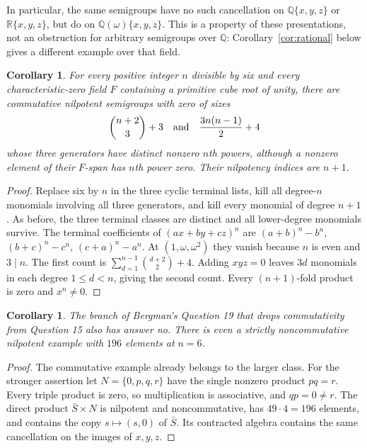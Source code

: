 \documentclass[11pt]{article}
\newtheorem{corollary}[theorem]{Corollary}
\begin{document}
In particular, the same semigroups have no such cancellation on
$\mathbb Q\{x,y,z\}$ or $\mathbb R\{x,y,z\}$, but do on
$\mathbb Q(\omega)\{x,y,z\}$. This is a property of these presentations,
not an obstruction for arbitrary semigroups over $\mathbb Q$:
Corollary~\ref{cor:rational} below gives a different example over that field.

\begin{corollary}\label{cor:multiples}
For every positive integer $n$ divisible by six and every characteristic-zero
field $F$ containing a primitive cube root of unity, there are commutative
nilpotent semigroups with zero of sizes
\[
\binom{n+2}{3}+3\quad\hbox{and}\quad \frac{3n(n-1)}2+4
\]
whose three generators have distinct nonzero $n$th powers, although a
nonzero element of their $F$-span has $n$th power zero.
Their nilpotency indices are $n+1$.
\end{corollary}
\begin{proof}
Replace six by $n$ in the three cyclic terminal lists, kill all degree-$n$
monomials involving all three generators, and kill every monomial of
degree $n+1$. As before, the three terminal classes are distinct and
all lower-degree monomials survive. The terminal coefficients of
$(ax+by+cz)^n$ are $(a+b)^n-b^n$, $(b+c)^n-c^n$, $(c+a)^n-a^n$.
At $(1,\omega,\omega^2)$ they vanish because $n$ is even and $3\mid n$.
The first count is $\sum_{d=1}^{n-1}\binom{d+2}{2}+4$.
Adding $xyz=0$ leaves $3d$ monomials in each degree $1\le d<n$, giving
the second count. Every $(n+1)$-fold product is zero and $x^n\ne0$.
\end{proof}

\begin{corollary}\label{cor:19}
The branch of Bergman's Question 19 that drops commutativity from
Question 15 also has answer no. There is even a strictly noncommutative
nilpotent example with $196$ elements at $n=6$.
\end{corollary}
\begin{proof}
The commutative example already belongs to the larger class. For the
stronger assertion let $N=\{0,p,q,r\}$ have the single nonzero product
$pq=r$. Every triple product is zero, so multiplication is associative,
and $qp=0\ne r$. The direct product $\bar S\times N$ is nilpotent and
noncommutative, has $49\cdot4=196$ elements, and contains the copy
$s\mapsto(s,0)$ of $\bar S$. Its contracted algebra contains the same
cancellation on the images of $x,y,z$.
\end{proof}
\end{document}
